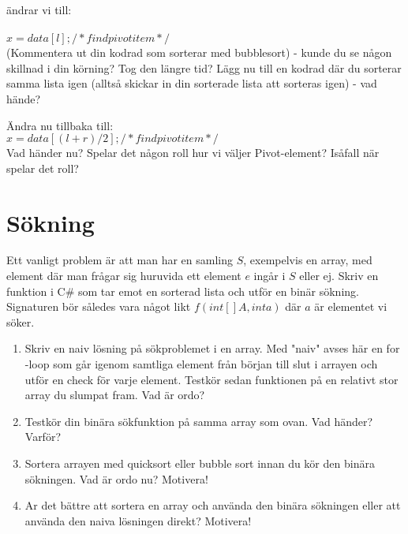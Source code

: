 \documentclass{article}
\begin{document}
ändrar vi till: \\\\
$x = data[l]; /* find pivot item */$ \\

(Kommentera ut din kodrad som sorterar med bubblesort) - kunde du se någon skillnad i din körning? Tog den längre tid? Lägg nu till en kodrad där du sorterar samma lista igen (alltså skickar in din sorterade lista att sorteras igen) - vad hände?

Ändra nu tillbaka till: \\

$x = data[(l + r) / 2]; /* find pivot item */$ \\

Vad händer nu? Spelar det någon roll hur vi väljer Pivot-element? Isåfall när spelar det roll? 


\section*{Sökning}
Ett vanligt problem är att man har en samling $S$, exempelvis en array, med element där man
frågar sig huruvida ett element $e$ ingår i $S$ eller ej. Skriv en funktion i C\# som tar emot en sorterad lista och utför en binär sökning. Signaturen bör således vara något likt $f(int[ ] A, int a) $ där $a$ är elementet vi söker.
\begin{enumerate}
\item Skriv en naiv lösning på sökproblemet i en array. Med "naiv" avses här en for -loop
som går igenom samtliga element från början till slut i arrayen och utför en check för
varje element. Testkör sedan funktionen på en relativt stor array du slumpat fram. Vad
är ordo?
\item Testkör din binära sökfunktion på samma array som ovan. Vad händer? Varför?
\item Sortera arrayen med quicksort eller bubble sort innan du kör den binära sökningen.
Vad är ordo nu? Motivera!
\item Ar det bättre att sortera en array och använda den binära sökningen eller att använda
den naiva lösningen direkt? Motivera!
\end{enumerate}
\end{document}
